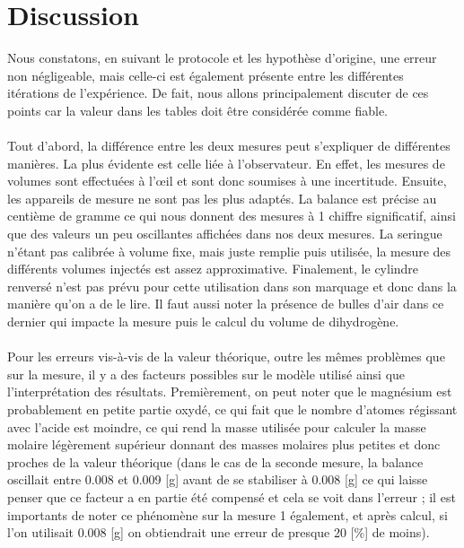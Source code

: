 \documentclass[11pt]{article}
\begin{document}
\section{Discussion}
Nous constatons, en suivant le protocole et les hypothèse d'origine, une erreur non négligeable, mais celle-ci est également présente entre les différentes itérations de l'expérience. De fait, nous allons principalement discuter de ces points car la valeur dans les tables doit être considérée comme fiable. \\ \\
Tout d'abord, la différence entre les deux mesures peut s'expliquer de différentes manières. La plus évidente est celle liée à l'observateur. En effet, les mesures de volumes sont effectuées à l’œil et sont donc soumises à une incertitude. Ensuite, les appareils de mesure ne sont pas les plus adaptés. La balance est précise au centième de gramme ce qui nous donnent des mesures à 1 chiffre significatif, ainsi que des valeurs un peu oscillantes affichées dans nos deux mesures. La seringue n'étant pas calibrée à volume fixe, mais juste remplie puis utilisée, la mesure des différents volumes injectés est assez approximative. Finalement, le cylindre renversé n'est pas prévu pour cette utilisation dans son marquage et donc dans la manière qu'on a de le lire. Il faut aussi noter la présence de bulles d'air dans ce dernier qui impacte la mesure puis le calcul du volume de dihydrogène. \\ \\
Pour les erreurs vis-à-vis de la valeur théorique, outre les mêmes problèmes que sur la mesure, il y a des facteurs possibles sur le modèle utilisé ainsi que l'interprétation des résultats. Premièrement, on peut noter que le magnésium est probablement en petite partie oxydé, ce qui fait que le nombre d'atomes régissant avec l'acide est moindre, ce qui rend la masse utilisée pour calculer la masse molaire légèrement supérieur donnant des masses molaires plus petites et donc proches de la valeur théorique (dans le cas de la seconde mesure, la balance oscillait entre 0.008 et 0.009 [g] avant de se stabiliser à 0.008 [g] ce qui laisse penser que ce facteur a en partie été compensé et cela se voit dans l'erreur ; il est importants de noter ce phénomène sur la mesure 1 également, et après calcul, si l'on utilisait 0.008 [g] on obtiendrait une erreur de presque 20 [\%] de moins). \\
\end{document}
